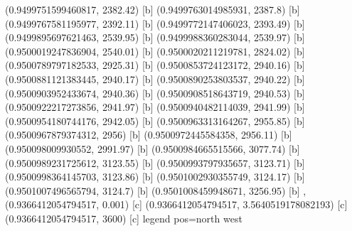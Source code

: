 {{{(0.9499751599460817, 2382.42) [b] 
(0.9499763014985931, 2387.8) [b] 
(0.9499767581195977, 2392.11) [b] 
(0.9499772147406023, 2393.49) [b] 
(0.9499895697621463, 2539.95) [b] 
(0.9499988360283044, 2539.97) [b] 
(0.9500019247836904, 2540.01) [b] 
(0.9500020211219781, 2824.02) [b] 
(0.9500789797182533, 2925.31) [b] 
(0.9500853724123172, 2940.16) [b] 
(0.9500881121383445, 2940.17) [b] 
(0.9500890253803537, 2940.22) [b] 
(0.9500903952433674, 2940.36) [b] 
(0.9500908518643719, 2940.53) [b] 
(0.9500922217273856, 2941.97) [b] 
(0.9500940482114039, 2941.99) [b] 
(0.9500954180744176, 2942.05) [b] 
(0.9500963313164267, 2955.85) [b] 
(0.9500967879374312, 2956) [b] 
(0.9500972445584358, 2956.11) [b] 
(0.950098009930552, 2991.97) [b] 
(0.9500984665515566, 3077.74) [b] 
(0.9500989231725612, 3123.55) [b] 
(0.9500993797935657, 3123.71) [b] 
(0.9500998364145703, 3123.86) [b] 
(0.9501002930355749, 3124.17) [b] 
(0.9501007496565794, 3124.7) [b] 
(0.9501008459948671, 3256.95) [b] 
},{(0.9366412054794517, 0.001) [c] 
(0.9366412054794517, 3.5640519178082193) [c] 
(0.9366412054794517, 3600) [c] 
}}}{legend pos=north west}